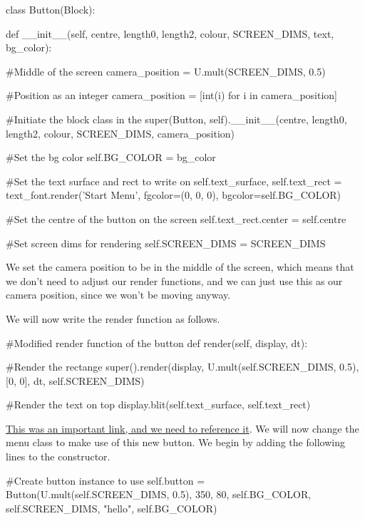 \begin{mpy}
class Button(Block):

    def __init__(self, centre, length0, length2, colour, SCREEN_DIMS, text, bg_color):
        
        #Middle of the screen
        camera_position = U.mult(SCREEN_DIMS, 0.5)

        #Position as an integer
        camera_position = [int(i) for i in camera_position]

        #Initiate the block class in the 
        super(Button, self).__init__(centre, length0, length2, colour, SCREEN_DIMS, camera_position)

        #Set the bg color
        self.BG_COLOR = bg_color

        #Set the text surface and rect to write on
        self.text_surface, self.text_rect = text_font.render('Start Menu', fgcolor=(0, 0, 0), bgcolor=self.BG_COLOR)

        #Set the centre of the button on the screen
        self.text_rect.center = self.centre

        #Set screen dims for rendering
        self.SCREEN_DIMS = SCREEN_DIMS
\end{mpy}

We set the camera position to be in the middle of the screen, which means that we don't need to adjust our render functions, and we can just use this as our camera position, since we won't be moving anyway.

\vs
We will now write the render function as follows.

\begin{mpy}

    #Modified render function of the button
    def render(self, display, dt):

        #Render the rectange
        super().render(display, U.mult(self.SCREEN_DIMS, 0.5), [0, 0], dt, self.SCREEN_DIMS)

        #Render the text on top
        display.blit(self.text_surface, self.text_rect)
\end{mpy}

\href{https://stackoverflow.com/questions/23982907/how-to-center-text-in-pygame}{This was an important link, and we need to reference it}. We will now change the  menu class to make use of this new button. We begin by adding the following lines to the constructor.

\vs
\begin{mpy}
        #Create button instance to use
        self.button = Button(U.mult(self.SCREEN_DIMS, 0.5), 350, 80, self.BG_COLOR, self.SCREEN_DIMS, "hello", self.BG_COLOR)
\end{mpy}

